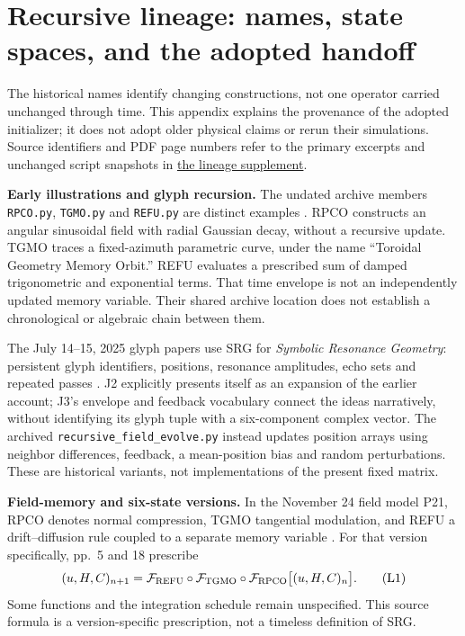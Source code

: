 \clearpage
\section{Recursive lineage: names, state spaces, and the adopted handoff}
\label{app:lineage}

The historical names identify changing constructions, not one operator carried unchanged through time. This appendix explains the provenance of the adopted initializer; it does not adopt older physical claims or rerun their simulations. Source identifiers and PDF page numbers refer to the primary excerpts and unchanged script snapshots in \href{\detokenize{supplement/lineage/LINEAGE_LEDGER.md}}{the lineage supplement}.

\textbf{Early illustrations and glyph recursion.}
The undated archive members \texttt{RPCO.py}, \texttt{TGMO.py} and \texttt{REFU.py} are distinct examples \cite{earlyScripts}. RPCO constructs an angular sinusoidal field with radial Gaussian decay, without a recursive update. TGMO traces a fixed-azimuth parametric curve, under the name \textquotedblleft{}Toroidal Geometry Memory Orbit.\textquotedblright{} REFU evaluates a prescribed sum of damped trigonometric and exponential terms. That time envelope is not an independently updated memory variable. Their shared archive location does not establish a chronological or algebraic chain between them.

The July 14--15, 2025 glyph papers use SRG for \emph{Symbolic Resonance Geometry}: persistent glyph identifiers, positions, resonance amplitudes, echo sets and repeated passes \cite{glyphSRG}. J2 explicitly presents itself as an expansion of the earlier account; J3's envelope and feedback vocabulary connect the ideas narratively, without identifying its glyph tuple with a six-component complex vector. The archived \texttt{recursive\_field\_evolve.py} instead updates position arrays using neighbor differences, feedback, a mean-position bias and random perturbations. These are historical variants, not implementations of the present fixed matrix.

\textbf{Field-memory and six-state versions.}
In the November 24 field model P21, RPCO denotes normal compression, TGMO tangential modulation, and REFU a drift--diffusion rule coupled to a separate memory variable \cite{fieldRecursion}. For that version specifically, pp.~5 and 18 prescribe
\[
(u,H,C)_{n+1}=
 \mathcal F_{\rm REFU}\circ\mathcal F_{\rm TGMO}\circ
 \mathcal F_{\rm RPCO}\bigl[(u,H,C)_n\bigr].
\tag{L1}\label{eq:L1}
\]
Some functions and the integration schedule remain unspecified. This source formula is a version-specific prescription, not a timeless definition of SRG.


